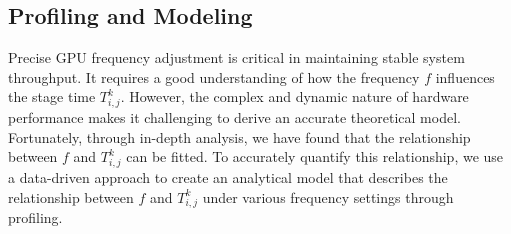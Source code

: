 



\subsection{Profiling and Modeling}
\label{sec:profiling}


Precise GPU frequency adjustment is critical in maintaining stable system throughput. 
It requires a good understanding of how the frequency $f$ influences the stage time $T_{i,j}^{k}$. 
However, the complex and dynamic nature of hardware performance makes it challenging to derive an accurate theoretical model. 
Fortunately, through in-depth analysis, we have found that the relationship between $f$ and $T_{i,j}^{k}$ can be fitted. 
To accurately quantify this relationship, 
we use a data-driven approach to create an analytical model that describes the relationship between $f$ and $T_{i,j}^{k}$ under various frequency settings through profiling.


